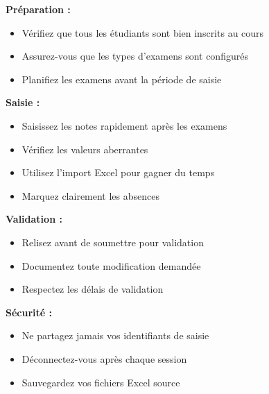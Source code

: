 \begin{tcolorbox}[colback=green!5!white,colframe=green!75!black,title=Recommandations pour la saisie des notes]

\textbf{Préparation :}
\begin{itemize}[leftmargin=*]
    \item Vérifiez que tous les étudiants sont bien inscrits au cours
    \item Assurez-vous que les types d'examens sont configurés
    \item Planifiez les examens avant la période de saisie
\end{itemize}

\textbf{Saisie :}
\begin{itemize}[leftmargin=*]
    \item Saisissez les notes rapidement après les examens
    \item Vérifiez les valeurs aberrantes
    \item Utilisez l'import Excel pour gagner du temps
    \item Marquez clairement les absences
\end{itemize}

\textbf{Validation :}
\begin{itemize}[leftmargin=*]
    \item Relisez avant de soumettre pour validation
    \item Documentez toute modification demandée
    \item Respectez les délais de validation
\end{itemize}

\textbf{Sécurité :}
\begin{itemize}[leftmargin=*]
    \item Ne partagez jamais vos identifiants de saisie
    \item Déconnectez-vous après chaque session
    \item Sauvegardez vos fichiers Excel source
\end{itemize}
\end{tcolorbox}

\newpage
